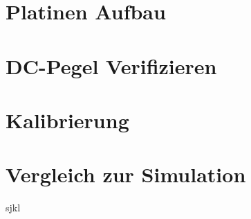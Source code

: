 
\section{Platinen Aufbau}
\section{DC-Pegel Verifizieren}
\section{Kalibrierung}
\section{Vergleich zur Simulation}
\clearpagefsjgjfg
sjkl
